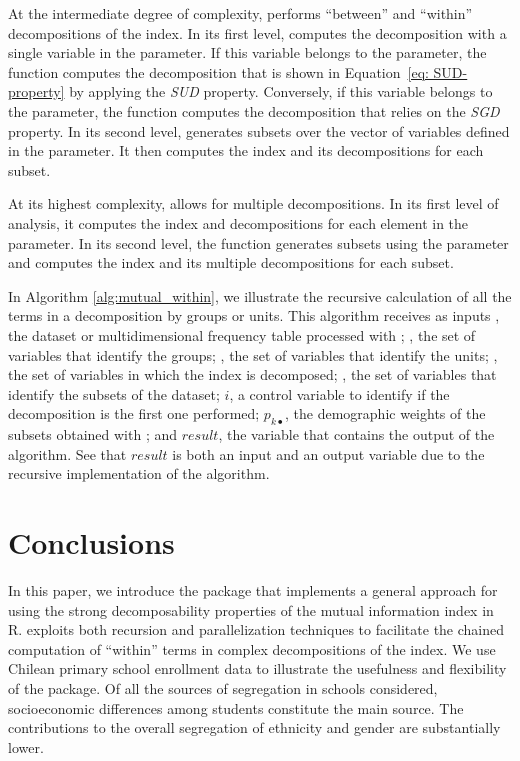 At the intermediate degree of complexity,  performs ``between'' and ``within'' decompositions of the index. In its first level, %
computes the decomposition %
with a single variable in the  parameter. If this variable belongs to the  parameter, the function computes the decomposition that is shown in Equation~\eqref{eq: SUD-property} by applying the \textit{SUD} property. Conversely, if this variable belongs to the  parameter, the function computes the decomposition that relies on the \textit{SGD} property. 
In its second level,  generates subsets over the vector of variables defined in the  parameter. It then computes the index and its decompositions for each subset. 

At its highest complexity,  allows for multiple decompositions. In its first level of analysis, it computes the index and decompositions for each element in the  parameter.%
In its second level, the function generates subsets using the  parameter and computes the index and its multiple decompositions for each subset.

In Algorithm \ref{alg:mutual_within}, we illustrate the recursive calculation of all the terms in a decomposition by groups or units. This algorithm receives as inputs , the dataset or  multidimensional frequency table processed with ; , the set of variables that identify the groups; , the set of variables that identify the units; , the set of variables in which the index is decomposed; , the set of variables that identify the subsets of the dataset; $i$, a control variable to identify if the decomposition is the first one performed; $p_{k \bullet}$, the demographic weights of the subsets obtained with ; and $result$, the variable that contains the output of the algorithm. See that $result$ is both an input and an output variable due to the recursive implementation of the algorithm. 

\section{Conclusions}
In this paper, we introduce the  package that implements a general approach for using the strong decomposability properties of the mutual information index in R.  exploits both recursion and parallelization techniques to facilitate the chained computation of ``within'' terms in complex decompositions of the index. We use Chilean primary school enrollment data to illustrate the usefulness and flexibility of the package. Of all the sources of segregation in schools considered, socioeconomic differences among students constitute the main source. The contributions to the overall segregation of ethnicity and gender are substantially lower.

